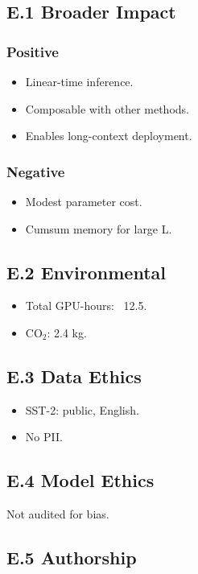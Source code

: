 \subsection{E.1 Broader Impact}

\subsubsection{Positive}
\begin{itemize}
\item Linear-time inference.
\item Composable with other methods.
\item Enables long-context deployment.

\end{itemize}
\subsubsection{Negative}
\begin{itemize}
\item Modest parameter cost.
\item Cumsum memory for large L.

\end{itemize}
\subsection{E.2 Environmental}

\begin{itemize}
\item Total GPU-hours: ~12.5.
\item CO$_2$: 2.4 kg.

\end{itemize}
\subsection{E.3 Data Ethics}

\begin{itemize}
\item SST-2: public, English.
\item No PII.

\end{itemize}
\subsection{E.4 Model Ethics}

Not audited for bias.

\subsection{E.5 Authorship}

